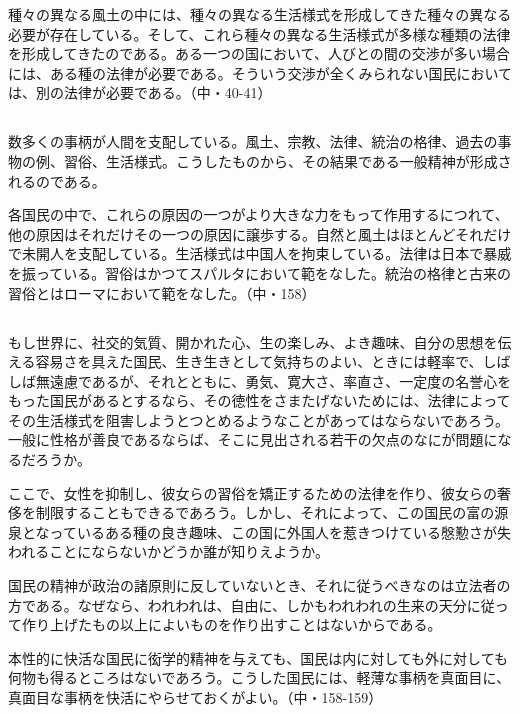 種々の異なる風土の中には、種々の異なる生活様式を形成してきた種々の異なる必要が存在している。そして、これら種々の異なる生活様式が多様な種類の法律を形成してきたのである。ある一つの国において、人びとの間の交渉が多い場合には、ある種の法律が必要である。そういう交渉が全くみられない国民においては、別の法律が必要である。（中・40-41）

\subsection{}


数多くの事柄が人間を支配している。風土、宗教、法律、統治の格律、過去の事物の例、習俗、生活様式。こうしたものから、その結果である一般精神が形成されるのである。

各国民の中で、これらの原因の一つがより大きな力をもって作用するにつれて、他の原因はそれだけその一つの原因に譲歩する。自然と風土はほとんどそれだけで未開人を支配している。生活様式は中国人を拘束している。法律は日本で暴威を振っている。習俗はかつてスパルタにおいて範をなした。統治の格律と古来の習俗とはローマにおいて範をなした。（中・158）


\subsection{}


もし世界に、社交的気質、開かれた心、生の楽しみ、よき趣味、自分の思想を伝える容易さを具えた国民、生き生きとして気持ちのよい、ときには軽率で、しばしば無遠慮であるが、それとともに、勇気、寛大さ、率直さ、一定度の名誉心をもった国民があるとするなら、その徳性をさまたげないためには、法律によってその生活様式を阻害しようとつとめるようなことがあってはならないであろう。一般に性格が善良であるならば、そこに見出される若干の欠点のなにが問題になるだろうか。

ここで、女性を抑制し、彼女らの習俗を矯正するための法律を作り、彼女らの奢侈を制限することもできるであろう。しかし、それによって、この国民の富の源泉となっているある種の良き趣味、この国に外国人を惹きつけている慇懃さが失われることにならないかどうか誰が知りえようか。

国民の精神が政治の諸原則に反していないとき、それに従うべきなのは立法者の方である。なぜなら、われわれは、自由に、しかもわれわれの生来の天分に従って作り上げたもの以上によいものを作り出すことはないからである。

本性的に快活な国民に衒学的精神を与えても、国民は内に対しても外に対しても何物も得るところはないであろう。こうした国民には、軽薄な事柄を真面目に、真面目な事柄を快活にやらせておくがよい。（中・158-159）




